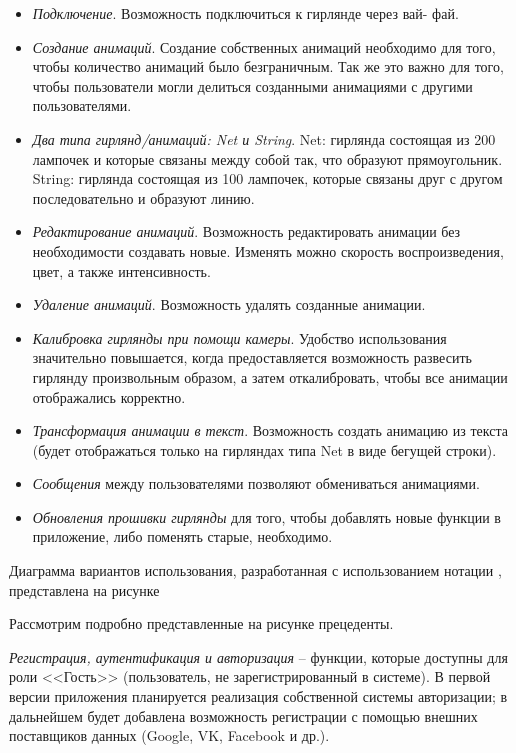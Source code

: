 \begin{itemize}
	\item \emph{Подключение}. Возможность подключиться к гирлянде через вай- фай.
	\item \emph{Создание анимаций}. Создание собственных анимаций необходимо для того, чтобы количество анимаций было безграничным. Так же это важно для того, чтобы пользователи могли делиться созданными анимациями с другими пользователями.
	\item \emph{Два типа гирлянд/анимаций: Net и String}. Net: гирлянда состоящая из 200 лампочек и которые связаны между собой так, что образуют прямоугольник. String: гирлянда состоящая из 100 лампочек, которые связаны друг с другом последовательно и образуют линию.
	\item \emph{Редактирование анимаций}. Возможность редактировать анимации без необходимости создавать новые. Изменять можно скорость воспроизведения, цвет, а также интенсивность.
	\item \emph{Удаление анимаций}. Возможность удалять созданные анимации.
	\item \emph{Калибровка гирлянды при помощи камеры}. Удобство использования значительно повышается, когда предоставляется возможность развесить гирлянду произвольным образом, а затем откалибровать, чтобы все анимации отображались корректно.
	\item \emph{Трансформация анимации в текст}. Возможность создать анимацию из текста (будет отображаться только на гирляндах типа Net в виде бегущей строки).
	\item \emph{Сообщения} между пользователями позволяют обмениваться анимациями.
	\item \emph{Обновления прошивки гирлянды} для того, чтобы добавлять новые функции в приложение, либо поменять старые, необходимо.
\end{itemize}

Диаграмма вариантов использования, разработанная с использованием нотации \uml, представлена на рисунке%



\pagebreak
Рассмотрим подробно представленные на рисунке прецеденты.

\emph{Регистрация, аутентификация и авторизация} -- функции, которые доступны для роли <<Гость>> (пользователь, не зарегистрированный в системе). В первой версии приложения планируется реализация собственной системы авторизации; в дальнейшем будет добавлена возможность регистрации с помощью внешних поставщиков данных (Google, VK, Facebook и др.).

